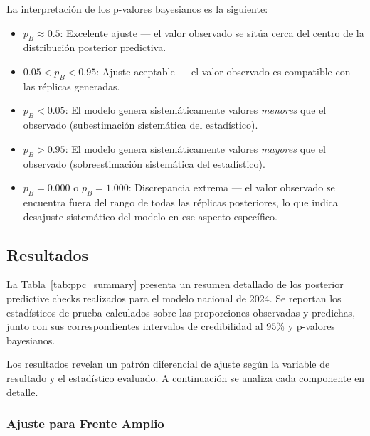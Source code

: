 La interpretaci\'on de los p-valores bayesianos es la siguiente:
\begin{itemize}
    \item $p_B \approx 0.5$: Excelente ajuste --- el valor observado se sit\'ua cerca del centro de la distribuci\'on posterior predictiva.
    \item $0.05 < p_B < 0.95$: Ajuste aceptable --- el valor observado es compatible con las r\'eplicas generadas.
    \item $p_B < 0.05$: El modelo genera sistem\'aticamente valores \emph{menores} que el observado (subestimaci\'on sistem\'atica del estad\'istico).
    \item $p_B > 0.95$: El modelo genera sistem\'aticamente valores \emph{mayores} que el observado (sobreestimaci\'on sistem\'atica del estad\'istico).
    \item $p_B = 0.000$ o $p_B = 1.000$: Discrepancia extrema --- el valor observado se encuentra fuera del rango de todas las r\'eplicas posteriores, lo que indica desajuste sistem\'atico del modelo en ese aspecto espec\'ifico.
\end{itemize}

\subsection{Resultados}
\label{subsec:ppc_resultados}

La Tabla~\ref{tab:ppc_summary} presenta un resumen detallado de los posterior predictive checks realizados para el modelo nacional de 2024. Se reportan los estad\'isticos de prueba calculados sobre las proporciones observadas y predichas, junto con sus correspondientes intervalos de credibilidad al 95\% y p-valores bayesianos.



Los resultados revelan un patr\'on diferencial de ajuste seg\'un la variable de resultado y el estad\'istico evaluado. A continuaci\'on se analiza cada componente en detalle.

\subsubsection{Ajuste para Frente Amplio}

